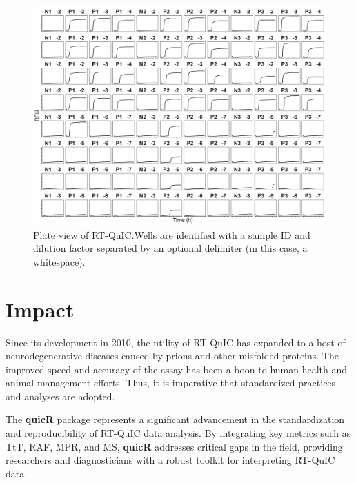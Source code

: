 \documentclass[preprint,12pt,a4paper]{elsarticle}
\providecommand{\DIFaddtex}[1]{{\protect\color{blue}\uwave{#1}}} %
\providecommand{\DIFaddbegin}{} %
\providecommand{\DIFaddend}{} %
\providecommand{\DIFaddFL}[1]{\DIFadd{#1}} %
\providecommand{\DIFaddbeginFL}{} %
\providecommand{\DIFaddendFL}{} %
\providecommand{\DIFadd}[1]{\texorpdfstring{\DIFaddtex{#1}}{#1}} %
\begin{document}
            \begin{figure}[ht]
                \centering
                \includegraphics[width=\textwidth]{images/plate_view.png}
                \caption{Plate view of RT-QuIC.\DIFaddbeginFL \DIFaddFL{\ }\DIFaddendFL Wells are identified with a sample ID and dilution factor separated by an optional delimiter (in this case, a whitespace).}\label{fig:plateview}
            \end{figure}

    \section{Impact}
        Since its development in 2010\DIFaddbegin \DIFadd{~}\DIFaddend \cite{Wilham2010,Atarashi2011}, the utility of RT-QuIC has expanded to a host of neurodegenerative diseases caused by prions and other misfolded proteins\DIFaddbegin \DIFadd{~}\DIFaddend \cite{Orru2024,ALWAKIL202597,Wang2024}. The improved speed and accuracy of the assay has been a boon to human health\DIFaddbegin \DIFadd{~}\DIFaddend \cite{Orru2015,green2019rt,race2019transmission,vascellari2022real} and animal management efforts\DIFaddbegin \DIFadd{~}\DIFaddend \cite{huang2025chronic,cooper2019detection,piel2024validation,harpaz2024transmission}. Thus, it is imperative that standardized practices and analyses are adopted.

        The \textbf{quicR} package represents a significant advancement in the standardization and reproducibility of RT-QuIC data analysis. By integrating key metrics such as TtT\DIFaddbegin \DIFadd{~}\DIFaddend \cite{Orru2015}, RAF\DIFaddbegin \DIFadd{~}\DIFaddend \cite{Gallups2022}, MPR\DIFaddbegin \DIFadd{~}\DIFaddend \cite{Rowden2023}, and MS\DIFaddbegin \DIFadd{~}\DIFaddend \cite{Henderson2015}, \textbf{quicR} addresses critical gaps in the field, providing researchers and diagnosticians with a robust toolkit for interpreting RT-QuIC data.
\end{document}
